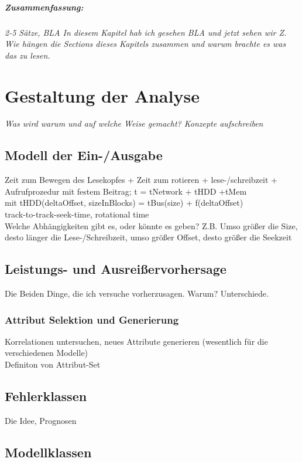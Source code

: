 \documentclass[
	12pt,
	a4paper,
	BCOR10mm,
	DIV14,
	listof=totoc,
	bibliography=totoc,
	headsepline
]{scrreprt}
\begin{document}
\paragraph{Zusammenfassung:}
\textit{2-5 Sätze, BLA In diesem Kapitel hab ich gesehen BLA und jetzt sehen wir Z. Wie hängen die Sections dieses Kapitels zusammen und warum brachte es was das zu lesen.}


\chapter{Gestaltung der Analyse}
\textit{%
	Was wird warum und auf welche Weise gemacht? Konzepte aufschreiben
}
\bigskip

\section{Modell der Ein-/Ausgabe}
Zeit zum Bewegen des Lesekopfes + Zeit zum rotieren + lese-/schreibzeit + Aufrufprozedur mit festem Beitrag; t = tNetwork + tHDD +tMem \\
mit tHDD(deltaOffset, sizeInBlocks) = tBus(size) + f(deltaOffset)\\
track-to-track-seek-time, rotational time\\
Welche Abhängigkeiten gibt es, oder könnte es geben? Z.B. Umso größer die Size, desto länger die Lese-/Schreibzeit, umso größer Offset, desto größer die Seekzeit

\section{Leistungs- und Ausreißervorhersage}
Die Beiden Dinge, die ich versuche vorherzusagen. Warum? Unterschiede. \\
\subsection{Attribut Selektion und Generierung}
Korrelationen untersuchen, neues Attribute generieren (wesentlich für die verschiedenen Modelle)\\
Definiton von Attribut-Set\\

\section{Fehlerklassen}
Die Idee, Prognosen

\section{Modellklassen}
\end{document}
